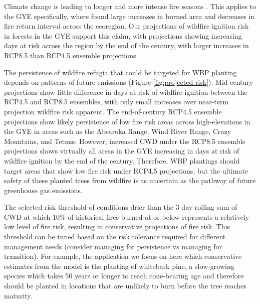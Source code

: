 \documentclass[11p]{article}
\begin{document}
Climate change is leading to longer and more intense fire seasons \citep{abatzoglouImpactAnthropogenicClimate2016,abatzoglouProjectedIncreasesWestern2021,littellReviewRelationshipsDrought2016,jollyClimateinducedVariationsGlobal2015}. This applies to the GYE specifically, where \citet{westerlingContinuedWarmingCould2011} found large increases in burned area and decreases in fire return interval across the ecoregion. Our projections of wildfire ignition risk in forests in the GYE support this claim, with projections showing increasing days at risk across the region by the end of the century, with larger increases in RCP8.5 than RCP4.5 ensemble projections.

The persistence of wildfire refugia that could be targeted for WBP planting depends on patterns of future emissions (Figure \ref{fig:projected-risk}). Mid-century projections show little difference in days at risk of wildfire ignition between the RCP4.5 and RCP8.5 ensembles, with only small increases over near-term projection wildfire risk apparent. The end-of-century RCP4.5 ensemble projections show likely persistence of low fire risk areas across high-elevations in the GYE in areas such as the Absaroka Range, Wind River Range, Crazy Mountains, and Tetons. However, increased CWD under the RCP8.5 ensemble projections shows virtually all areas in the GYE increasing in days at risk of wildfire ignition by the end of the century. Therefore, WBP plantings should target areas that show low fire risk under RCP4.5 projections, but the ultimate safety of these planted trees from wildfire is as uncertain as the pathway of future greenhouse gas emissions.

The selected risk threshold of conditions drier than the 3-day rolling sum of CWD at which 10\% of historical fires burned at or below represents a relatively low level of fire risk, resulting in conservative projections of fire risk. This threshold can be tuned based on the risk tolerance required for different management needs (consider managing for persistence vs managing for transition). For example, the application we focus on here which conservative estimates from the model is the planting of whitebark pine, a slow-growing species which takes 50 years or longer to reach cone-bearing age \citep{tombackWhitebarkPineCommunities2001} and therefore should be planted in locations that are unlikely to burn before the tree reaches maturity.
\end{document}
